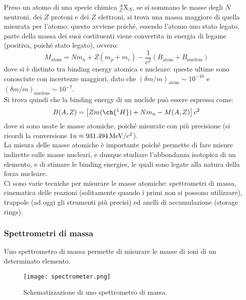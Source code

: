 Preso un atomo di una specie chimica $ ^A_Z \text{X}_N $, se si sommano le masse degli $ N $ neutroni, dei $ Z $ protoni e dei $ Z $ elettroni, si trova una massa maggiore di quella misurata per l'atomo: questo avviene poiché, essendo l'atomo uno stato legato, parte della massa dei suoi costituenti viene convertita in energia di legame (positiva, poiché stato legato), ovvero:
\begin{equation}
	M_{\text{atom}} = N m_n + Z \left( m_p + m_e \right) - \frac{1}{c^2} \left( B_{\text{atom}} + B_{\text{nucleus}} \right)
	\label{eq:1.17}
\end{equation}
dove si è distinto tra binding energy atomica e nucleare: queste ultime sono conosciute con incertezze maggiori, dato che $ (\delta m / m)_{\text{atom}} \sim 10^{-10} $ e $ (\delta m / m)_{\text{nucleus}} \sim 10^{-7} $.\\
Si trova quindi che la binding energy di un nuclide può essere espressa come:
\begin{equation}
	B(A,Z) = \left[ Z m({\ch{^{1}H}}) + N m_n - M(A,Z) \right] c^2
	\label{eq:1.18}
\end{equation}
dove si sono usate le masse atomiche, poiché misurate con più precisione (si ricordi la conversione $ 1u \approx 931.494\,\mathrm{MeV}/c^2 $).\\
La misura delle masse atomiche è importante poiché permette di fare misure indirette sulle masse nucleari, e dunque studiare l'abbondanza isotopica di un elemento, e di stimare le binding energies, le quali sono legate alla natura della forza nucleare.\\
Ci sono varie tecniche per misurare le masse atomiche: spettrometri di massa, cinematica delle reazioni (solitamente quando i primi non si possono utilizzare), trappole (ad oggi gli strumenti più precisi) ed anelli di accumulazione (storage rings).

\subsubsection{Spettrometri di massa}

Uno spettrometro di massa permette di misurare le masse di ioni di un determinato elemento.
\begin{figure}[!b]
	\centering
	\texttt{[image: spectrometer.png]}
	\caption{Schematizzazione di uno spettrometro di massa.}
	\label{spettr}
\end{figure}

